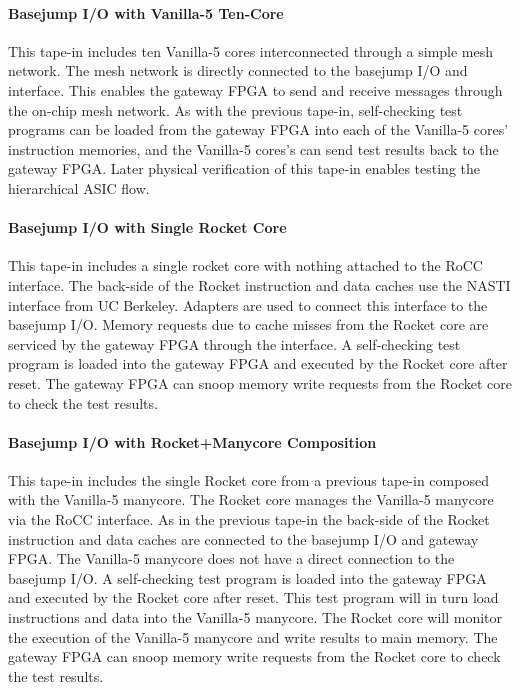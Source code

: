 \paragraph{Basejump I/O with Vanilla-5 Ten-Core}
This tape-in includes ten Vanilla-5 cores interconnected through a simple
mesh network. The mesh network is directly connected to the basejump I/O
and  interface. This enables the gateway FPGA to send and
receive messages through the on-chip mesh network. As with the previous
tape-in, self-checking test programs can be loaded from the gateway FPGA
into each of the Vanilla-5 cores' instruction memories, and the Vanilla-5
cores's can send test results back to the gateway FPGA. Later physical
verification of this tape-in enables testing the hierarchical ASIC flow.

\paragraph{Basejump I/O with Single Rocket Core}
This tape-in includes a single rocket core with nothing attached to the
RoCC interface. The back-side of the Rocket instruction and data caches
use the NASTI interface from UC Berkeley. Adapters are used to connect
this interface to the basejump I/O. Memory requests due to cache misses
from the Rocket core are serviced by the gateway FPGA through the
 interface. A self-checking test program is loaded into the
gateway FPGA and executed by the Rocket core after reset. The gateway
FPGA can snoop memory write requests from the Rocket core to check the
test results.

\paragraph{Basejump I/O with Rocket+Manycore Composition}
This tape-in includes the single Rocket core from a previous tape-in
composed with the Vanilla-5 manycore. The Rocket core manages the
Vanilla-5 manycore via the RoCC interface. As in the previous tape-in the
back-side of the Rocket instruction and data caches are connected to the
basejump I/O and gateway FPGA. The Vanilla-5 manycore does not have a
direct connection to the basejump I/O. A self-checking test program is
loaded into the gateway FPGA and executed by the Rocket core after reset.
This test program will in turn load instructions and data into the
Vanilla-5 manycore. The Rocket core will monitor the execution of the
Vanilla-5 manycore and write results to main memory. The gateway FPGA can
snoop memory write requests from the Rocket core to check the test
results.

